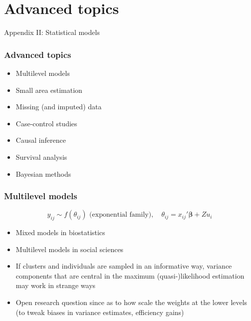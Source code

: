 \documentclass{beamer}
\begin{document}
\section{Advanced topics}

\begin{frame}

\centering

\Large Appendix II: Statistical models

\end{frame}



\begin{frame}\frametitle{Advanced topics}

\begin{itemize}
    \item Multilevel models
    \item Small area estimation
    \item Missing (and imputed) data
    \item Case-control studies
    \item Causal inference
    \item Survival analysis
    \item Bayesian methods
\end{itemize}

\end{frame}


\begin{frame}\frametitle{Multilevel models}

$$
y_{ij} \sim f(\theta_{ij}) \mbox{ (exponential family)}, \quad \theta_{ij} = x_{ij}'\mathbf{\beta}  + Z u_i
$$

\begin{itemize}
    \item Mixed models in biostatistics
    \item Multilevel models in social sciences
    \item If clusters and individuals are sampled in an informative way,
        variance components that are central in the maximum (quasi-)likelihood estimation
        may work in strange ways
    \item Open research question since \citet{pfef:skin:holm:gold:rasb:1998} as to how
        scale the weights at the lower levels (to tweak biases in variance estimates, efficiency gains)
\end{itemize}

\end{frame}
\end{document}
